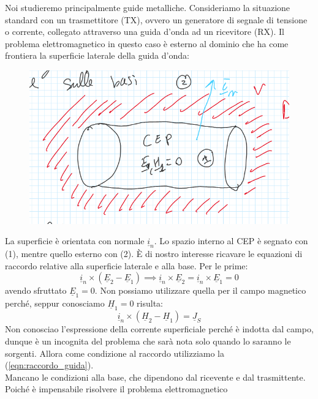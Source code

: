 \documentclass{book}
\begin{document}
        Noi studieremo principalmente guide metalliche. Consideriamo la situazione standard con un trasmettitore (TX),
        ovvero un generatore di segnale di tensione o corrente, collegato attraverso una guida d'onda ad un ricevitore (RX).
        Il problema elettromagnetico in questo caso è esterno al dominio che ha come frontiera la superficie laterale della
        guida d'onda:
        \begin{figure}[h!]
            \center 
            \includegraphics[width=0.75\linewidth]{Chapter_two/Chapt2img1.png}
        \end{figure}
        La superficie è orientata con normale $\underline{i}_{n}$. Lo spazio interno al CEP è segnato con (1), mentre quello esterno con
        (2). È di nostro interesse ricavare le equazioni di raccordo relative alla superficie laterale e alla base. Per le prime:
        \begin{equation}
            \label{eqn:raccordo_guida}
            \underline{i}_{n}\times (\underline{E}_{2}-\underline{E}_{1})\implies \underline{i}_{n}\times \underline{E}_{2}=\underline{i}_{n} \times \underline{E}_{1} = 0
        \end{equation}
        avendo sfruttato $\underline{E}_{1}=0$. Non possiamo utilizzare quella per il campo magnetico perché, seppur conosciamo $\underline{H}_{1}=0$ risulta:
        \begin{equation}
            \underline{i}_{n} \times (\underline{H}_{2}-\underline{H}_{1}) = \underline{J}_{S}
        \end{equation}
        Non conosciao l'espressione della corrente superficiale perché è indotta dal campo, dunque è un incognita del problema che 
        sarà nota solo quando lo saranno le sorgenti. Allora come condizione al raccordo utilizziamo la (\ref{eqn:raccordo_guida}). \\
        Mancano le condizioni alla base, che dipendono dal ricevente e dal trasmittente. Poiché è impensabile risolvere il problema elettromagnetico 
\end{document}
